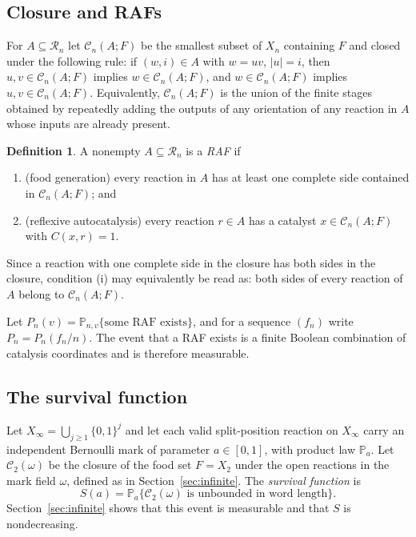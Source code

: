 \documentclass[11pt,reqno]{amsart}
\theoremstyle{plain}
\theoremstyle{definition}
\newtheorem{definition}[theorem]{Definition}
\theoremstyle{remark}
\numberwithin{equation}{section}
\newcommand{\Prob}{\mathbb{P}}
\newcommand{\cC}{\mathcal{C}}
\newcommand{\cR}{\mathcal{R}}
\newcommand{\Xinf}{X_\infty}
\begin{document}
\subsection{Closure and RAFs}
For $A\subseteq\cR_n$ let $\cC_n(A;F)$ be the smallest subset of $X_n$ containing $F$ and closed under the following rule: if $(w,i)\in A$ with $w=uv$, $|u|=i$, then $u,v\in\cC_n(A;F)$ implies $w\in\cC_n(A;F)$, and $w\in\cC_n(A;F)$ implies $u,v\in\cC_n(A;F)$. Equivalently, $\cC_n(A;F)$ is the union of the finite stages obtained by repeatedly adding the outputs of any orientation of any reaction in $A$ whose inputs are already present.

\begin{definition}\label{def:raf}
A nonempty $A\subseteq\cR_n$ is a \emph{RAF} if
\begin{enumerate}[label=(\roman*)]
\item (food generation) every reaction in $A$ has at least one complete side contained in $\cC_n(A;F)$; and
\item (reflexive autocatalysis) every reaction $r\in A$ has a catalyst $x\in\cC_n(A;F)$ with $C(x,r)=1$.
\end{enumerate}
Since a reaction with one complete side in the closure has both sides in the closure, condition (i) may equivalently be read as: both sides of every reaction of $A$ belong to $\cC_n(A;F)$.
\end{definition}

Let $P_n(v)=\Prob_{n,v}\{\text{some RAF exists}\}$, and for a sequence $(f_n)$ write $P_n=P_n(f_n/n)$. The event that a RAF exists is a finite Boolean combination of catalysis coordinates and is therefore measurable.

\subsection{The survival function}
Let $\Xinf=\bigcup_{j\ge1}\{0,1\}^j$ and let each valid split-position reaction on $\Xinf$ carry an independent Bernoulli mark of parameter $a\in[0,1]$, with product law $\Prob_a$. Let $\cC_2(\omega)$ be the closure of the food set $F=X_2$ under the open reactions in the mark field $\omega$, defined as in Section~\ref{sec:infinite}. The \emph{survival function} is
\begin{equation}\label{eq:S}
S(a)=\Prob_a\{\cC_2(\omega)\text{ is unbounded in word length}\}.
\end{equation}
Section~\ref{sec:infinite} shows that this event is measurable and that $S$ is nondecreasing.
\end{document}
